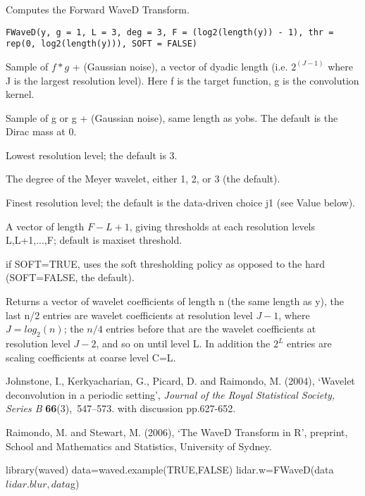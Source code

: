 \documentclass{article}
\begin{document}
\begin{Description}\relax
Computes the Forward WaveD Transform.
\end{Description}
\begin{Usage}
\begin{verbatim}
FWaveD(y, g = 1, L = 3, deg = 3, F = (log2(length(y)) - 1), thr = rep(0, log2(length(y))), SOFT = FALSE)
\end{verbatim}
\end{Usage}
\begin{Arguments}
\begin{ldescription}
\item[\code{y}] Sample of $f*g$ + (Gaussian noise), a vector of dyadic length 
(i.e. $2^(J-1)$ where J is the largest resolution level). 
Here f is the target function, g is the convolution kernel.
\item[\code{g}] Sample of g or g + (Gaussian noise), same length as yobs.
The default is the Dirac mass at 0.
\item[\code{L}] Lowest resolution level; the default is 3.
\item[\code{deg}] The degree of the Meyer wavelet, either 1, 2, or 3 (the default).
\item[\code{F}] Finest resolution level; the default is the data-driven choice j1
(see Value below).
\item[\code{thr}] A vector of length $F-L+1$, giving thresholds at each resolution levels L,L+1,...,F; default is maxiset threshold.
\item[\code{SOFT}] if SOFT=TRUE, uses the soft thresholding policy as opposed to the
hard (SOFT=FALSE, the default).
\end{ldescription}
\end{Arguments}
\begin{Value}
Returns a vector of wavelet coefficients of length n (the same length as y),
the last n/2 entries are wavelet coefficients at resolution level $J-1$, where
$J = log_2(n)$; the $n/4$ entries before that are the wavelet coefficients at
resolution level $J-2$, and so on until level L. In addition the $2^L$ entries
are scaling coefficients at coarse level C=L.
\end{Value}
\begin{References}\relax
Johnstone, I., Kerkyacharian, G., Picard, D. and Raimondo, M.  (2004), 
`Wavelet deconvolution in a periodic
setting', {\em Journal of the Royal Statistical Society, Series B} {\bf
66}(3),~547--573.  with discussion pp.627-652.

Raimondo, M. and Stewart, M. (2006),
`The WaveD Transform in R', preprint, School and Mathematics and Statistics,
University of Sydney.
\end{References}
\begin{SeeAlso}\relax
{}
\end{SeeAlso}
\begin{Examples}
\begin{ExampleCode}
library(waved)
data=waved.example(TRUE,FALSE)
lidar.w=FWaveD(data$lidar.blur,data$g)
\end{ExampleCode}
\end{Examples}
\end{document}
